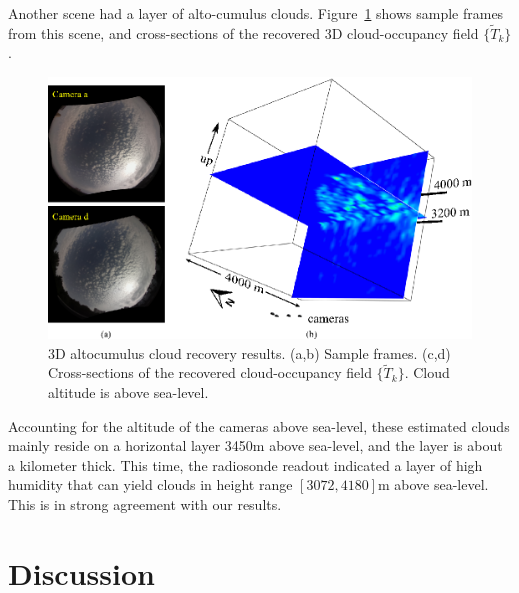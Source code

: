 \documentclass[runningheads]{llncs}
\begin{document}
Another scene had a layer of alto-cumulus clouds. Figure~\ref{fig:alto} shows sample frames from this scene, and cross-sections of the recovered 3D cloud-occupancy field $\{\tilde T_k\}$.
\begin{figure}[t!]
\begin{center}
   \includegraphics[width=1\linewidth]{figures/altos.eps}
\end{center}
   \vspace{-0.6cm}
   \caption{3D altocumulus cloud recovery results. (a,b) Sample frames.
   (c,d)  Cross-sections of the recovered cloud-occupancy field $\{\tilde T_k\}$. Cloud
   altitude is above sea-level.}
\label{fig:alto}
\end{figure}
Accounting for the altitude of the cameras above sea-level, these estimated clouds mainly reside on a horizontal layer 3450m above sea-level, and the layer is about a kilometer thick. This time, the radiosonde readout indicated a layer of high humidity that can yield clouds in height range $[3072,4180]$m above sea-level. This is in strong agreement with our results.





%


\section{Discussion}
\label{sec:discuss}
\end{document}
